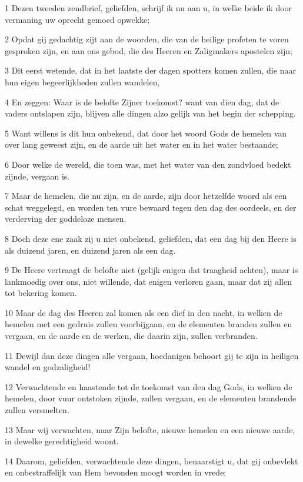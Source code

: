 \par 1 Dezen tweeden zendbrief, geliefden, schrijf ik nu aan u, in welke beide ik door vermaning uw oprecht gemoed opwekke;
\par 2 Opdat gij gedachtig zijt aan de woorden, die van de heilige profeten te voren gesproken zijn, en aan ons gebod, die des Heeren en Zaligmakers apostelen zijn;
\par 3 Dit eerst wetende, dat in het laatste der dagen spotters komen zullen, die naar hun eigen begeerlijkheden zullen wandelen,
\par 4 En zeggen: Waar is de belofte Zijner toekomst? want van dien dag, dat de vaders ontslapen zijn, blijven alle dingen alzo gelijk van het begin der schepping.
\par 5 Want willens is dit hun onbekend, dat door het woord Gods de hemelen van over lang geweest zijn, en de aarde uit het water en in het water bestaande;
\par 6 Door welke de wereld, die toen was, met het water van den zondvloed bedekt zijnde, vergaan is.
\par 7 Maar de hemelen, die nu zijn, en de aarde, zijn door hetzelfde woord als een schat weggelegd, en worden ten vure bewaard tegen den dag des oordeels, en der verderving der goddeloze mensen.
\par 8 Doch deze ene zaak zij u niet onbekend, geliefden, dat een dag bij den Heere is als duizend jaren, en duizend jaren als een dag.
\par 9 De Heere vertraagt de belofte niet (gelijk enigen dat traagheid achten), maar is lankmoedig over ons, niet willende, dat enigen verloren gaan, maar dat zij allen tot bekering komen.
\par 10 Maar de dag des Heeren zal komen als een dief in den nacht, in welken de hemelen met een gedruis zullen voorbijgaan, en de elementen branden zullen en vergaan, en de aarde en de werken, die daarin zijn, zullen verbranden.
\par 11 Dewijl dan deze dingen alle vergaan, hoedanigen behoort gij te zijn in heiligen wandel en godzaligheid!
\par 12 Verwachtende en haastende tot de toekomst van den dag Gods, in welken de hemelen, door vuur ontstoken zijnde, zullen vergaan, en de elementen brandende zullen versmelten.
\par 13 Maar wij verwachten, naar Zijn belofte, nieuwe hemelen en een nieuwe aarde, in dewelke gerechtigheid woont.
\par 14 Daarom, geliefden, verwachtende deze dingen, benaarstigt u, dat gij onbevlekt en onbestraffelijk van Hem bevonden moogt worden in vrede;
